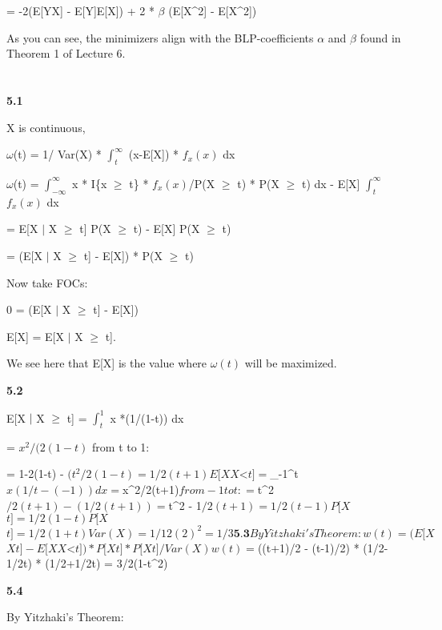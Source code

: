 = -2(E[YX] - E[Y]E[X]) + 2 * $\beta$ (E[X^2] - E[X^2])

As you can see, the minimizers align with the BLP-coefficients $\alpha$ and $\beta$ found in Theorem 1 of Lecture 6.

\section{}

\textbf{5.1}

X is continuous,

$\omega$(t) = 1/ Var(X) * $\int_{t}^{\infty}$ (x-E[X]) * $f_{x}(x)$ dx

$\omega$(t) = $\int_{-\infty}^{\infty}$ x * I\{x $\geq$ t\} * $f_{x}(x)$/P(X $\geq$ t) * P(X $\geq$ t) dx - E[X] $\int_{t}^{\infty}$ $f_{x}(x)$ dx

= E[X $\mid$ X $\geq$ t] P(X $\geq$ t) - E[X] P(X $\geq$ t)

= (E[X $\mid$ X $\geq$ t] - E[X]) * P(X $\geq$ t) 

Now take FOCs:

0 = (E[X $\mid$ X $\geq$ t] - E[X]) 

E[X] = E[X $\mid$ X $\geq$ t].

We see here that E[X] is the value where $\omega(t)$ will be maximized.

\textbf{5.2}

E[X $\mid$ X $\geq$ t] = $\int_{t}^{1}$ x *(1/(1-t)) dx 

= $x^{2}/(2(1-t)$ from t to 1: 

= 1-2(1-t) - $(t^{2}/2(1-t) = 1/2(t+1)

E[X $\mid$ X $<$ t] = $\int_{-1}^{t}$ x(1/t-(-1)) dx = $x^{2}/2(t+1)$ from -1 to t:

= $t^{2}$/2(t+1) - (1/2(t+1)) = $t^{2} - 1$/2(t+1) = 1/2(t-1)

P[X $\geq$ t] = 1/2(1-t)

P[X $\leq$ t] = 1/2(1+t)

Var(X) = 1/12(2)^2 = 1/3
 
\textbf{5.3}

By Yitzhaki's Theorem:

w(t) = (E[X $\mid$ X $\geq$ t] - E[X $\mid$ X $<$ t]) * P[X $\geq$ t] * P[X $\leq$ t] / Var(X)

w(t) = $((t+1)/2 - (t-1)/2) * (1/2-1/2t) * (1/2+1/2t) = 3/2(1-t^{2}) 

\textbf{5.4}

By Yitzhaki's Theorem:

